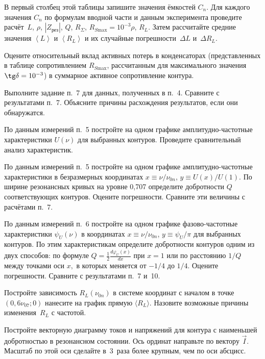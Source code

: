 \begin{lab:task}
В первый столбец этой таблицы запишите значения ёмкостей $C_n$. 
Для каждого значения $C_n$ по формулам вводной части и данным 
эксперимента проведите  расчёт~$L$, 
$\rho$, $|Z_{\text{рез}}|$, $Q$, $R_{\Sigma}$, 
$R_{S \text{max}}=10^{-3}\rho$, $R_L$.
Затем рассчитайте средние значения $\left< L \right>$ и $\left< R_L \right>$ 
и их случайные погрешности~$\Delta L$ и~$\Delta R_L$.


Оцените относительный вклад активных потерь в конденсаторах 
(представленных в таблице сопротивлением $R_{S\text{max}}$, рассчитанным для
максимального значения $\tg\delta=10^{-3}$) в суммарное активное сопротивление
контура.

\item *Выполните задание п.~7 для данных,
полученных в п.~4. Сравните с результатами п.~7. Объясните причины расхождения
результатов, если они обнаружатся.

\item По данным измерений п.~5 постройте на одном графике амплитудно-частотные
характеристики $U(\nu)$  для выбранных контуров. Проведите сравнительный 
анализ характеристик.

\item По данным измерений п.~5 постройте на одном графике амплитудно-частотные
характеристики в безразмерных координатах $x\equiv \nu/\nu_{0n}$, $y\equiv
U(x)/U(1).$ По ширине резонансных кривых на уровне 0,707 определите добротности
$Q$ соответствующих контуров. Оцените погрешности. Сравните эти величины с
расчётами п.~7.

\item По данным измерений п.~6 постройте на одном графике фазово-частотные
характеристики $\psi_U(\nu)$ в координатах $x\equiv \nu/\nu_{0n}$, $y\equiv\psi_U/\pi$
для выбранных контуров. По этим характеристикам определите добротности контуров
одним из двух способов: по формуле $Q=\frac12 \frac{d\varphi_U(x)}{dx}$ при $x=1$ или по
расстоянию $1/Q$ между точками оси $x,$ в которых  меняется от $-1/4$ до $1/4$. 
Оцените погрешности. Сравните с результатами п.~7 и~10.

\item Постройте зависимость $R_L(\nu_{0n})$ в системе координат с началом 
в точке $(0,6\nu_{07};0)$ нанесите на график прямую $\langle R_L \rangle$. 
Назовите возможные причины изменения~$R_L$ с частотой.

\item Постройте векторную диаграмму токов и напряжений для контура 
с наименьшей добротностью в резонансном состоянии. Ось ординат направьте по 
вектору $\vec{I}.$ Масштаб по этой оси  сделайте в~3~раза 
более крупным, чем по оси абсцисс.
\end{lab:task}


